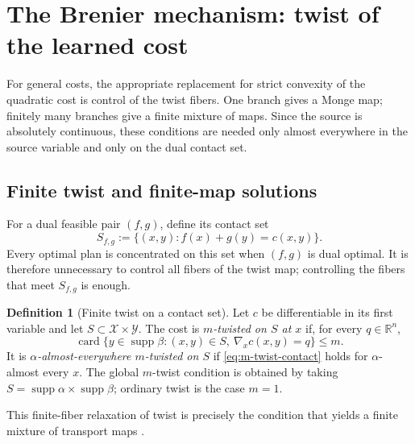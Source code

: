 \documentclass[11pt,a4paper]{article}
\theoremstyle{definition}
\newtheorem{definition}[theorem]{Definition}
\theoremstyle{remark}
\newcommand{\R}{\mathbb R}
\newcommand{\supp}{\operatorname{supp}}
\newcommand{\card}{\operatorname{card}}
\begin{document}
\section{The Brenier mechanism: twist of the learned cost}
\label{sec:rkhs-twist}

For general costs, the appropriate replacement for strict convexity of the
quadratic cost is control of the twist fibers.  One branch gives a Monge map;
finitely many branches give a finite mixture of maps.  Since the source is
absolutely continuous, these conditions are needed only almost everywhere in
the source variable and only on the dual contact set.

\subsection{Finite twist and finite-map solutions}

For a dual feasible pair \((f,g)\), define its contact set
\begin{equation}
  S_{f,g}:=\{(x,y):f(x)+g(y)=c(x,y)\}.
  \label{eq:dual-contact-set}
\end{equation}
Every optimal plan is concentrated on this set when \((f,g)\) is dual
optimal.  It is therefore unnecessary to control all fibers of the twist
map; controlling the fibers that meet \(S_{f,g}\) is enough.

\begin{definition}[Finite twist on a contact set]
\label{def:ae-twist}
Let \(c\) be differentiable in its first variable and let
\(S\subset\mathcal X\times\mathcal Y\).  The cost is
\emph{\(m\)-twisted on \(S\) at \(x\)} if, for every \(q\in\R^n\),
\begin{equation}
  \card\{y\in\supp\beta:(x,y)\in S,
            \ \nabla_xc(x,y)=q\}\leq m.
  \label{eq:m-twist-contact}
\end{equation}
It is \emph{\(\alpha\)-almost-everywhere \(m\)-twisted on \(S\)} if
\eqref{eq:m-twist-contact} holds for \(\alpha\)-almost every \(x\).  The
global \(m\)-twist condition is obtained by taking
\(S=\supp\alpha\times\supp\beta\); ordinary twist is the case \(m=1\).
\end{definition}

This finite-fiber relaxation of twist is precisely the condition that yields
a finite mixture of transport maps \citep{MoameniPass2017}.
\end{document}
